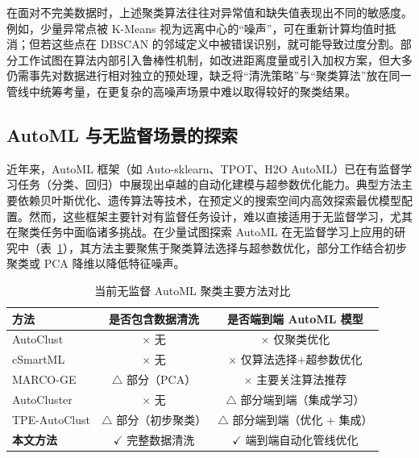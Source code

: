 \documentclass[10pt]{article} %
\numberwithin{equation}{section}
\begin{document}
在面对不完美数据时，上述聚类算法往往对异常值和缺失值表现出不同的敏感度。例如，少量异常点被 K-Means 视为远离中心的“噪声”，可在重新计算均值时抵消\cite{Atif2024}；但若这些点在 DBSCAN 的邻域定义中被错误识别，就可能导致过度分割\cite{Guo2024}。部分工作试图在算法内部引入鲁棒性机制，如改进距离度量或引入加权方案\cite{8896034}，但大多仍需事先对数据进行相对独立的预处理，缺乏将“清洗策略”与“聚类算法”放在同一管线中统筹考量，在更复杂的高噪声场景中难以取得较好的聚类结果。

\subsection{AutoML 与无监督场景的探索}

近年来，AutoML 框架（如 Auto-sklearn\cite{10.5555/3586589.3586850}、TPOT\cite{Olson2019, Romano2021}、H2O AutoML）已在有监督学习任务（分类、回归）中展现出卓越的自动化建模与超参数优化能力。典型方法主要依赖贝叶斯优化、遗传算法\cite{10.1145/3674029.3674058}等技术，在预定义的搜索空间内高效探索最优模型配置。然而，这些框架主要针对有监督任务设计，难以直接适用于无监督学习，尤其在聚类任务中面临诸多挑战\cite{10.1145/3643564}。在少量试图探索 AutoML 在无监督学习上应用的研究中（表~\ref{tab:aml_clustering_summary}），其方法主要聚焦于聚类算法选择与超参数优化，部分工作结合初步聚类或 PCA 降维以降低特征噪声。

\begin{table}[t]
\centering\small
\setlength{\tabcolsep}{6pt}
\renewcommand{\arraystretch}{1.2}
\caption{当前无监督 AutoML 聚类主要方法对比}
\begin{tabular}{lcc}
\toprule
\textbf{方法} & \textbf{是否包含数据清洗} & \textbf{是否端到端 AutoML 模型} \\
\midrule
AutoClust\cite{9338346}          & $\times$ 无                  & $\times$ 仅聚类优化 \\
cSmartML\cite{9671542}           & $\times$ 无                  & $\times$ 仅算法选择+超参数优化 \\
MARCO-GE\cite{10031201}          & $\triangle$ 部分（PCA）      & $\times$ 主要关注算法推荐 \\
AutoCluster\cite{10.1007/978-3-030-75768-720} &
                                  $\times$ 无                  & $\triangle$ 部分端到端（集成学习） \\
TPE-AutoClust\cite{10031132}     & $\triangle$ 部分（初步聚类） & $\triangle$ 部分端到端（优化 + 集成） \\
\textbf{本文方法}                & $\checkmark$ 完整数据清洗   & $\checkmark$ 端到端自动化管线优化 \\
\bottomrule
\end{tabular}
\label{tab:aml_clustering_summary}
\end{table}
\end{document}

